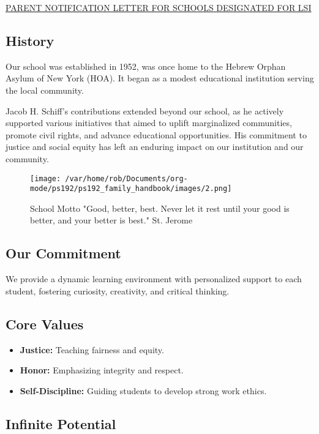 \documentclass[11pt]{article}
\begin{document}
\href{https://4.files.edl.io/760e/02/07/24/000734-b96f6af6-0f19-4829-999f-2eb23313280d.pdf}{PARENT NOTIFICATION LETTER FOR SCHOOLS DESIGNATED FOR LSI}

\subsection{History}
\label{sec:org07a03aa}

Our school was established in 1952, was once home to the Hebrew Orphan Asylum of New York (HOA). It began as a modest educational institution serving the local community.

Jacob H. Schiff’s contributions extended beyond our school, as he actively supported various initiatives that aimed to uplift marginalized communities, promote civil rights, and advance educational opportunities. His commitment to justice and social equity has left an enduring impact on our institution and our community.

\begin{figure}[htbp]
\centering
\texttt{[image: /var/home/rob/Documents/org-mode/ps192/ps192\_family\_handbook/images/2.png]}
\caption{School Motto "Good, better, best. Never let it rest until your good is better, and your better is best." St. Jerome}
\end{figure}

\subsection{Our Commitment}
\label{sec:orgfc95ce5}

We provide a dynamic learning environment with personalized support to each student, fostering curiosity, creativity, and critical thinking.

\subsection{Core Values}
\label{sec:org449705b}

\begin{itemize}
\item \textbf{\textbf{Justice:}} Teaching fairness and equity.
\item \textbf{\textbf{Honor:}} Emphasizing integrity and respect.
\item \textbf{\textbf{Self-Discipline:}} Guiding students to develop strong work ethics.
\end{itemize}

\subsection{Infinite Potential}
\label{sec:org9e72bd7}
\end{document}
